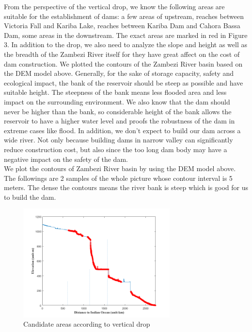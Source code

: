 \documentclass{mcmthesis}
\begin{document}
From the perspective of the vertical drop, we know the following areas are suitable for the establishment of dams: a few areas of upstream, reaches between Victoria Fall and Kariba Lake, reaches between Kariba Dam and Cahora Bassa Dam, some areas in the downstream. The exact areas are marked in red in Figure 3. In addition to the drop, we also need to analyze the slope and height as well as the breadth of the Zambezi River itself for they have great affect on the cost of dam construction. We plotted the contours of the Zambezi River basin based on the DEM model above. Generally, for the sake of storage capacity, safety and ecological impact, the bank of the reservoir should be steep as possible and have suitable height. The steepness of the bank means less flooded area and less impact on the surrounding environment. We also know that the dam should never be higher than the bank, so considerable height of the bank allows the reservoir to have a higher water level and proofs the robustness of the dam in extreme cases like flood. In addition, we don't expect to build our dam across a wide river. Not only because building dams in narrow valley can significantly reduce construction cost, but also since the too long dam body may have a negative impact on the safety of the dam.\\
\indent We plot the contours of Zambezi River basin by using the DEM model above. The followings are 2 samples of the whole picture whose contour interval is 5 meters. The dense the contours means the river bank is steep which is good for us to build the dam.\\

\begin{figure}[h]
\small
\centering
\includegraphics[width=8cm]{./figures/highlight0.png}
\caption{Candidate areas according to vertical drop} \label{fig:Fig3}
\end{figure}
\end{document}

